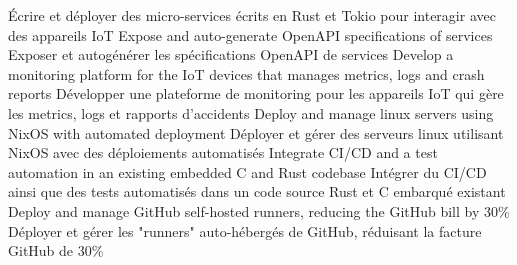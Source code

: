                     {Écrire et déployer des micro-services écrits en Rust et Tokio pour interagir avec des appareils IoT}
                \resumeItemEnFr
                    {Expose and auto-generate OpenAPI specifications of services}
                    {Exposer et autogénérer les spécifications OpenAPI de services}
                \resumeItemEnFr
                    {Develop a monitoring platform for the IoT devices that manages metrics, logs and crash reports}
                    {Développer une plateforme de monitoring pour les appareils IoT qui gère les metrics, logs et rapports d'accidents}
                \resumeItemEnFr
                    {Deploy and manage linux servers using NixOS with automated deployment}
                    {Déployer et gérer des serveurs linux utilisant NixOS avec des déploiements automatisés}
                \resumeItemEnFr
                    {Integrate CI/CD and a test automation in an existing embedded C and Rust codebase}
                    {Intégrer du CI/CD ainsi que des tests automatisés dans un code source Rust et C embarqué existant}
                \resumeItemEnFr
                    {Deploy and manage GitHub self-hosted runners, reducing the GitHub bill by 30\%}
                    {Déployer et gérer les "runners" auto-hébergés de GitHub, réduisant la facture GitHub de 30\%}

            \resumeItemListEnd
    \resumeSubHeadingListEnd


